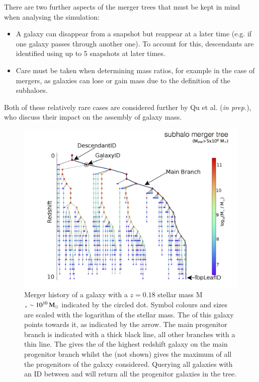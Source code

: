There are two further aspects of the merger trees that must be kept in mind when
analysing the simulation:
\begin{itemize}

\item A galaxy can disappear from a snapshot but reappear at a later time
  (e.g. if one galaxy passes through another one).  To account for this,
  descendants are identified using up to 5 snapshots at later times.

\item Care must be taken when determining mass ratios, for example in the case
  of mergers, as galaxies can lose or gain mass due to the definition of the
  subhaloes.
\end{itemize}

Both of these relatively rare cases are considered further by Qu et
al. (\textit{in prep.}), who discuss their impact on the assembly of galaxy
mass.\\

\begin{figure}[t]
\centering\includegraphics[width=\textwidth]{figures/nam_tree_ex.png}
\caption{Merger history of a galaxy with a $z=0.18$ stellar mass M$_*\sim10^{10}
  \, \mathrm{M}_\odot$ indicated by the circled dot. Symbol colours and sizes are scaled with
  the logarithm of the stellar mass. The \HaloID of this galaxy points towards
  it, as indicated by the arrow. The main progenitor branch is indicated with a
  thick black line, all other branches with a thin line. The \TopLeafID gives
  the \HaloID of the highest redshift galaxy on the main progenitor branch
  whilst the \LastProgID (not shown) gives the maximum \HaloID of all the
  progenitors of the galaxy considered. Querying all galaxies with an ID between
  \GalaxyID and \LastProgID will return all the progenitor galaxies in the
  tree.}
\label{fig:mergerTree}
\end{figure}

